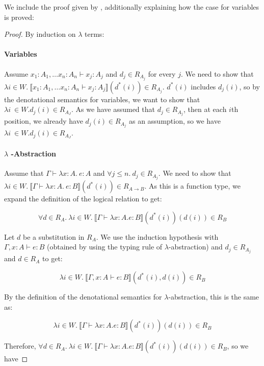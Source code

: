 We include the proof given by \citep{Streicher06}, additionally explaining how the case for variables is proved:

\begin{proof}
By induction on $\lambda$ terms:

\paragraph{Variables} Assume $x_1 : A_1, \dots x_n : A_n \vdash x_j : A_j$ and $d_j \in R_{A_j}$ for every $j$. We need to show that $\lambda i \in W. \ \llbracket x_1 : A_1, \dots x_n : A_n \vdash x_j : A_j \rrbracket(d^*(i)) \in R_{A_j} $. $d^*(i)$ includes $d_j(i)$, so by the denotational semantics for variables, we want to show that $\lambda i \ \in W. d_j(i) \in R_{A_J}$. As we have assumed that $d_j \in R_{A_j}$, then at each $i$th position, we already have $d_j(i) \in R_{A_j}$ as an assumption, so we have  $\lambda i \ \in W. d_j(i) \in R_{A_J}$.
 
\paragraph{$\lambda$ -Abstraction} Assume that $\Gamma \vdash \lambda x : A. \ e : A $ and $\forall j \leq n. \ d_j \in R_{A_j}$. We need to show that $\lambda i \in W. \  \llbracket \Gamma \vdash \lambda x : A. \ e : B \rrbracket (d^*(i)) \in R_{A \to B}$. As this is a function type, we expand the definition of the logical relation to get:

\[ \forall d \in R_A. \ \lambda i \in W. \ \llbracket \Gamma \vdash \lambda x:A. e : B \rrbracket (d^*(i))(d(i)) \in R_B\]

Let $d$ be a substitution in $R_A$. We use the induction hypothesis with $\Gamma, x : A \vdash e : B$ (obtained by using the typing rule of $\lambda$-abstraction) and $d_j \in R_{A_j}$  and $d \in R_A$ to get:

\[\lambda i \in W. \ \llbracket \Gamma ,x:A \vdash e : B \rrbracket (d^*(i),d(i))\in R_B \]

By the definition of the denotational semantics for $\lambda$-abstraction, this is the same as:

\[\lambda i \in W. \ \llbracket \Gamma \vdash \lambda x:A. e : B \rrbracket (d^*(i))(d(i)) \in R_B\]

Therefore, $\forall d \in R_A. \ \lambda i \in W. \ \llbracket \Gamma \vdash \lambda x:A. e : B \rrbracket (d^*(i))(d(i)) \in R_B$, so we have 


\end{proof}
